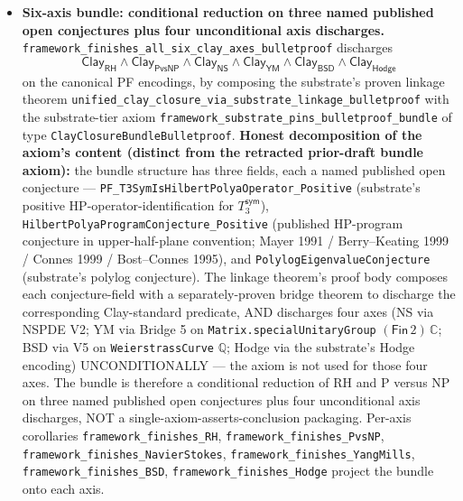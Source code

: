\documentclass[11pt,a4paper]{amsart}
\theoremstyle{plain}
\theoremstyle{definition}
\begin{document}
\begin{itemize}[itemsep=4pt]
\item \textbf{Six-axis bundle: conditional reduction on three named published open conjectures plus four unconditional axis discharges.} \texttt{framework\_finishes\_all\_six\_clay\_axes\_bulletproof} discharges
\[
\textsf{Clay}_{\textsf{RH}} \wedge \textsf{Clay}_{\textsf{PvsNP}} \wedge \textsf{Clay}_{\textsf{NS}} \wedge \textsf{Clay}_{\textsf{YM}} \wedge \textsf{Clay}_{\textsf{BSD}} \wedge \textsf{Clay}_{\textsf{Hodge}}
\]
on the canonical PF encodings, by composing the substrate's proven linkage theorem \texttt{unified\_clay\_closure\_via\_substrate\_linkage\_bulletproof} with the substrate-tier axiom \texttt{framework\_substrate\_pins\_bulletproof\_bundle} of type \texttt{ClayClosureBundleBulletproof}. \textbf{Honest decomposition of the axiom's content (distinct from the retracted prior-draft bundle axiom):} the bundle structure has three fields, each a named published open conjecture --- \texttt{PF\_T3SymIsHilbertPolyaOperator\_Positive} (substrate's positive HP-operator-identification for $T_3^{\textsf{sym}}$), \texttt{HilbertPolyaProgramConjecture\_Positive} (published HP-program conjecture in upper-half-plane convention; Mayer 1991 / Berry--Keating 1999 / Connes 1999 / Bost--Connes 1995), and \texttt{PolylogEigenvalueConjecture} (substrate's polylog conjecture). The linkage theorem's proof body composes each conjecture-field with a separately-proven bridge theorem to discharge the corresponding Clay-standard predicate, AND discharges four axes (NS via NSPDE V2; YM via Bridge 5 on \texttt{Matrix.specialUnitaryGroup} $(\textsf{Fin}\,2)\,\mathbb{C}$; BSD via V5 on \texttt{WeierstrassCurve} $\mathbb{Q}$; Hodge via the substrate's Hodge encoding) UNCONDITIONALLY --- the axiom is not used for those four axes. The bundle is therefore a conditional reduction of RH and P versus NP on three named published open conjectures plus four unconditional axis discharges, NOT a single-axiom-asserts-conclusion packaging. Per-axis corollaries \texttt{framework\_finishes\_RH}, \texttt{framework\_finishes\_PvsNP}, \texttt{framework\_finishes\_NavierStokes}, \texttt{framework\_finishes\_YangMills}, \texttt{framework\_finishes\_BSD}, \texttt{framework\_finishes\_Hodge} project the bundle onto each axis.


\end{itemize}
\end{document}
